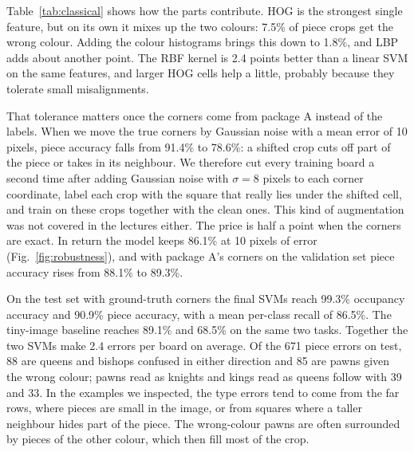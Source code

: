 Table~\ref{tab:classical} shows how the parts contribute. HOG is the strongest single feature, but on its own it mixes up the two colours: 7.5\% of piece crops get the wrong colour. Adding the colour histograms brings this down to 1.8\%, and LBP adds about another point. The RBF kernel is 2.4 points better than a linear SVM on the same features, and larger HOG cells help a little, probably because they tolerate small misalignments.

That tolerance matters once the corners come from package A instead of the labels. When we move the true corners by Gaussian noise with a mean error of 10 pixels, piece accuracy falls from 91.4\% to 78.6\%: a shifted crop cuts off part of the piece or takes in its neighbour. We therefore cut every training board a second time after adding Gaussian noise with $\sigma=8$ pixels to each corner coordinate, label each crop with the square that really lies under the shifted cell, and train on these crops together with the clean ones. This kind of augmentation was not covered in the lectures either. The price is half a point when the corners are exact. In return the model keeps 86.1\% at 10 pixels of error (Fig.~\ref{fig:robustness}), and with package A's corners on the validation set piece accuracy rises from 88.1\% to 89.3\%.

On the test set with ground-truth corners the final SVMs reach 99.3\% occupancy accuracy and 90.9\% piece accuracy, with a mean per-class recall of 86.5\%. The tiny-image baseline reaches 89.1\% and 68.5\% on the same two tasks. Together the two SVMs make 2.4 errors per board on average. Of the 671 piece errors on test, 88 are queens and bishops confused in either direction and 85 are pawns given the wrong colour; pawns read as knights and kings read as queens follow with 39 and 33. In the examples we inspected, the type errors tend to come from the far rows, where pieces are small in the image, or from squares where a taller neighbour hides part of the piece. The wrong-colour pawns are often surrounded by pieces of the other colour, which then fill most of the crop.

